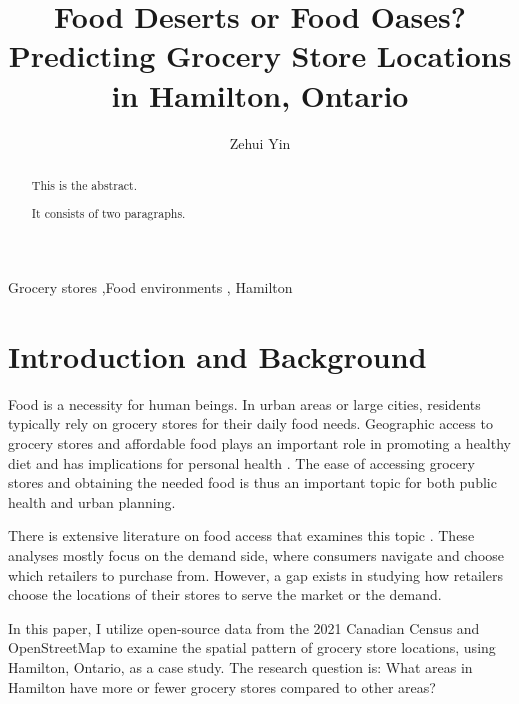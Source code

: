\documentclass[preprint, 3p,
authoryear]{elsarticle} %
\begin{document}
\begin{frontmatter}

  \title{Food Deserts or Food Oases? Predicting Grocery Store Locations
in Hamilton, Ontario}
    \author[sees]{Zehui Yin%
  }
  
  \begin{abstract}
  This is the abstract.

  It consists of two paragraphs.
  \end{abstract}
    \begin{keyword}
    Grocery stores \sep Food environments \sep 
    Hamilton
  \end{keyword}
  
 \end{frontmatter}

\section{Introduction and Background}\label{introduction-and-background}

Food is a necessity for human beings. In urban areas or large cities,
residents typically rely on grocery stores for their daily food needs.
Geographic access to grocery stores and affordable food plays an
important role in promoting a healthy diet and has implications for
personal health
\citep{caspi2012relationship, minaker2016retail, kirkpatrick2014dietary}.
The ease of accessing grocery stores and obtaining the needed food is
thus an important topic for both public health and urban planning.

There is extensive literature on food access that examines this topic
\citep{christian2012using, widener2015spatiotemporal, farber2014temporal, widener2017changes}.
These analyses mostly focus on the demand side, where consumers navigate
and choose which retailers to purchase from. However, a gap exists in
studying how retailers choose the locations of their stores to serve the
market or the demand.

In this paper, I utilize open-source data from the 2021 Canadian Census
\citep{census} and OpenStreetMap \citep{osm} to examine the spatial
pattern of grocery store locations, using Hamilton, Ontario, as a case
study. The research question is: What areas in Hamilton have more or
fewer grocery stores compared to other areas?
\end{document}

